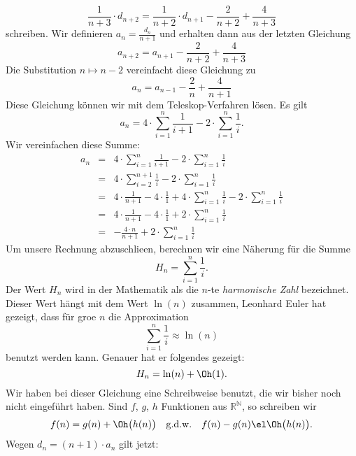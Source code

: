 \begin{equation}
  \label{eq:qs9}
 \frac{1}{n+3} \cdot d_{n+2} = \frac{1}{n+2}\cdot d_{n+1} - \frac{2}{n+2} + \frac{4}{n+3}  
\end{equation}
schreiben.  Wir definieren $\displaystyle a_n = \frac{d_n}{n+1}$ und erhalten dann aus der
letzten Gleichung 
\[ a_{n+2} = a_{n+1} - \frac{2}{n+2} + \frac{4}{n+3} \]
Die Substitution $n \mapsto n-2$ vereinfacht diese Gleichung zu 
\begin{equation}
  \label{eq:qs10}
 a_{n} = a_{n-1} - \frac{2}{n} + \frac{4}{n+1}  
\end{equation}
Diese Gleichung k\"onnen wir mit dem Teleskop-Verfahren l\"osen.  Es gilt 
\begin{equation}
  \label{eq:qs11}
 a_{n} = 4 \cdot \sum_{i=1}^n \frac{1}{i+1} - 2 \cdot \sum_{i=1}^n \frac{1}{i}.  
\end{equation}
Wir vereinfachen diese Summe:
\[
\begin{array}{lcl}
 a_{n} & = & \displaystyle 4 \cdot \sum_{i=1}^n \frac{1}{i+1} - 2 \cdot \sum_{i=1}^n \frac{1}{i} \\[0.5cm]
       & = & \displaystyle 4 \cdot \sum_{i=2}^{n+1} \frac{1}{i} - 2 \cdot \sum_{i=1}^n \frac{1}{i} \\[0.5cm]
       & = & \displaystyle 4 \cdot \frac{1}{n+1} - 4 \cdot \frac{1}{1} + 4 \cdot \sum_{i=1}^{n} \frac{1}{i} - 2 \cdot \sum_{i=1}^n \frac{1}{i} \\[0.5cm]
       & = & \displaystyle 4 \cdot \frac{1}{n+1} - 4 \cdot \frac{1}{1} + 2 \cdot \sum_{i=1}^{n} \frac{1}{i}  \\[0.5cm]
       & = & \displaystyle - \frac{4 \cdot n}{n+1}  + 2 \cdot \sum_{i=1}^{n} \frac{1}{i}  
\end{array}
\]
Um unsere Rechnung abzuschlie\3en, berechnen wir eine N\"aherung f\"ur die Summe 
\[ H_n = \sum\limits_{i=1}^{n}\frac{1}{i}.\]
Der Wert $H_n$ wird in der Mathematik als die $n$-te \emph{harmonische Zahl} bezeichnet.
Dieser Wert h\"angt mit dem Wert $\ln(n)$ zusammen, Leonhard Euler hat gezeigt, dass f\"ur
gro\3e $n$ die Approximation
\[ \sum\limits_{i=1}^n \frac{1}{i} \approx \ln(n)  \]
benutzt werden kann.  Genauer hat er folgendes gezeigt:
\[ H_n = \ln(n) + \Oh(1). \]
Wir haben bei dieser Gleichung eine Schreibweise benutzt, die wir bisher noch nicht
eingef\"uhrt haben.  Sind $f$, $g$, $h$ Funktionen aus $\mathbb{R}^\mathbb{N}$, so schreiben
wir 
\[ f(n) = g(n) + \Oh\bigl(h(n)\bigr) \quad \mathrm{g.d.w.} \quad
   f(n) - g(n) \el \Oh\bigl(h(n)\bigr). 
\]
Wegen $d_n = (n+1) \cdot a_{n}$ gilt jetzt: 
